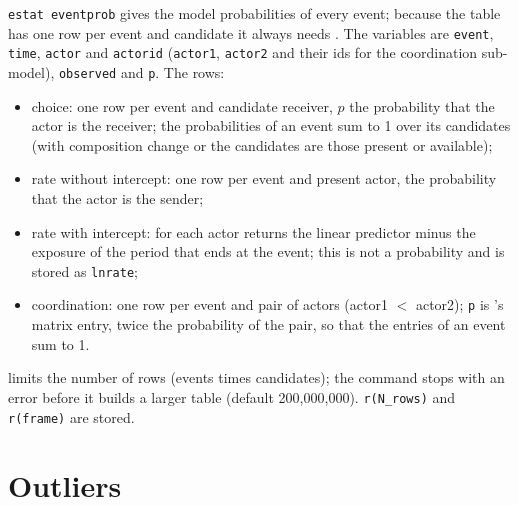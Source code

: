 \texttt{estat eventprob} gives the model probabilities of every event; because the table has one row per event and candidate it always needs . The variables are \texttt{event}, \texttt{time}, \texttt{actor} and \texttt{actorid} (\texttt{actor1}, \texttt{actor2} and their ids for the coordination sub-model), \texttt{observed} and \texttt{p}. The rows:
\begin{itemize}[nosep]
  \item choice: one row per event and candidate receiver, $p$ the probability that the actor is the receiver; the probabilities of an event sum to 1 over its candidates (with composition change or  the candidates are those present or available);
  \item rate without intercept: one row per event and present actor, the probability that the actor is the sender;
  \item rate with intercept: for each actor \goldfish{} returns the linear predictor minus the exposure of the period that ends at the event; this is not a probability and is stored as \texttt{lnrate};
  \item coordination: one row per event and pair of actors (actor1 $<$ actor2); \texttt{p} is \goldfish{}'s matrix entry, twice the probability of the pair, so that the entries of an event sum to 1.
\end{itemize}
 limits the number of rows (events times candidates); the command stops with an error before it builds a larger table (default 200,000,000). \texttt{r(N\_rows)} and \texttt{r(frame)} are stored.

\section{Outliers}\label{sec:outliers}

